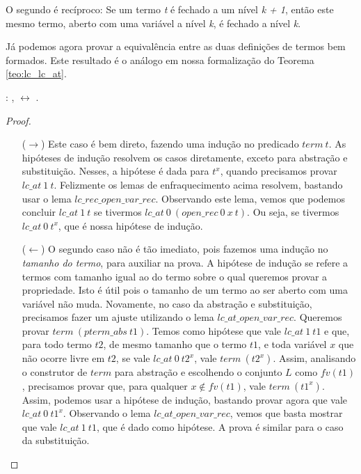 O segundo é recíproco: Se um termo \emph{t} é fechado a um nível
\emph{k + 1}, então este mesmo termo, aberto com uma variável a nível \emph{k},
é fechado a nível \emph{k}.

Já podemos agora provar a equivalência entre as duas definições de termos bem
formados. Este resultado é o análogo em nossa formalização do Teorema
\ref{teo:lc_lc_at}.

\bigskip
{}  : \coqdockw{\ensuremath{\forall}}
,   \ensuremath{\leftrightarrow}
 .\coqdoceol
\bigskip

\begin{proof}
    $ $\par\nobreak\ignorespaces
\begin{itemize}
    \item[($\rightarrow$)] Este caso é bem direto, fazendo uma indução no
        predicado $term\ t$. As hipóteses de indução resolvem os casos
        diretamente, exceto para abstração e substituição. Nesses, a hipótese é
        dada para $t^x$, quando precisamos provar $lc\_at\ 1\ t$. Felizmente os
        lemas de enfraquecimento acima resolvem, bastando usar o lema
        $lc\_rec\_open\_var\_rec$. Observando este lema, vemos que podemos
        concluir $lc\_at\ 1\ t$ se tivermos $lc\_at\ 0 \ (open\_rec\ 0\ x\ t)$.
        Ou seja, se tivermos $lc\_at\ 0\ t^x$, que é nossa hipótese de indução.

    \item[($\leftarrow$)] O segundo caso não é tão imediato, pois fazemos uma
        indução no \emph{tamanho do termo}, para auxiliar na prova. A hipótese
        de indução se refere a termos com tamanho igual ao do termo sobre o qual
        queremos provar a propriedade. Isto é útil pois o tamanho de um termo ao
        ser aberto com uma variável não muda. Novamente, no caso da abstração e
        substituição, precisamos fazer um ajuste utilizando o lema
        $lc\_at\_open\_var\_rec$. Queremos provar $term\ (pterm\_abs\ t1)$. Temos
        como hipótese que vale $lc\_at\ 1\ t1$ e que, para todo termo $t2$, de
        mesmo tamanho que o termo $t1$, e toda variável $x$ que não ocorre livre
        em $t2$, se vale $lc\_at\ 0\ t2^x$, vale $term\ (t2^x)$. Assim,
        analisando o construtor de $term$ para abstração e escolhendo o conjunto
        $L$ como $fv(t1)$, precisamos provar que, para qualquer $x \notin
        fv(t1)$, vale $term\ (t1^x)$. Assim, podemos usar a hipótese de indução,
        bastando provar agora que vale $lc\_at\ 0\ t1^x$. Observando o lema
        $lc\_at\_open\_var\_rec$, vemos que basta mostrar que vale $lc\_at\ 1\
        t1$, que é dado como hipótese. A prova é similar para o caso da
        substituição.
\end{itemize}
\end{proof}

